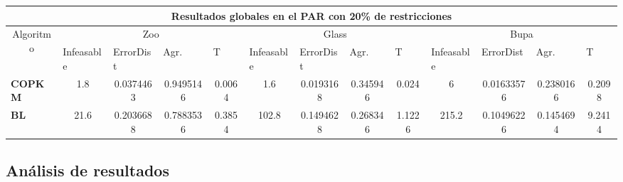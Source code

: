 \begin{table}[H]
	\scriptsize

	\begin{adjustwidth}{-1cm}{-1cm}%
	
	\begin{tabular}{|l|c|c|c|c|c|c|c|c|c|c|c|c|}
	\hline
	\multicolumn{13}{|c|}{\textbf{Resultados globales en el PAR con 20\% de restricciones}}                                                                                                                                                                                                                                                                                                                                            \\ \hline
	\multicolumn{1}{|c|}{\multirow{2}{*}{Algoritmo}} & \multicolumn{4}{c|}{Zoo}                                                                                          & \multicolumn{4}{c|}{Glass}                                                                                         & \multicolumn{4}{c|}{Bupa}                                                                                          \\ \cline{2-13} 
	\multicolumn{1}{|c|}{}                                  & \multicolumn{1}{l|}{Infeasable} & \multicolumn{1}{l|}{ErrorDist} & \multicolumn{1}{l|}{Agr.} & \multicolumn{1}{l|}{T} & \multicolumn{1}{l|}{Infeasable} & \multicolumn{1}{l|}{ErrorDist} & \multicolumn{1}{l|}{Agr.} & \multicolumn{1}{l|}{T} & \multicolumn{1}{l|}{Infeasable} & \multicolumn{1}{l|}{ErrorDist} & \multicolumn{1}{l|}{Agr.} & \multicolumn{1}{l|}{T} \\ \hline
	\textbf{COPKM}    & 1.8 & 0.0374463 &  0.9495146  & 0.0064       & 1.6 & 0.0193168 & 0.345946 & 0.024     & 6 & 0.01633576 & 0.2380166 & 0.2098  \\ \hline
	\textbf{BL}   & 21.6 & 0.2036688 & 0.7883536 & 0.3854     & 102.8 & 0.1494628 & 0.268346 & 1.1226 & 215.2 & 0.10496226 & 0.1454694 & 9.2414 		\\ \hline
	\end{tabular}
	
	\end{adjustwidth}
	
\end{table}

\subsection{Análisis de resultados}


